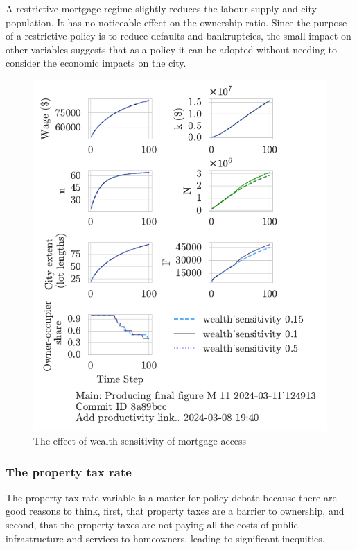 A restrictive mortgage regime slightly reduces the labour supply and city population. It has no noticeable effect on the ownership ratio. Since the purpose of a restrictive policy is to reduce defaults and bankruptcies, the small impact on other variables suggests that as a policy it can be adopted without needing to consider the economic impacts on the city. 

\begin{figure}[h!bt]
    \centering
    \includegraphics[scale=.8, trim={0 1.4cm 0 0},clip]{fig/wealth_sensitivity-124913.pdf}
    \caption{The effect of wealth sensitivity of mortgage access}
    \label{fig:wealth_sensitivity_ownership_trajectory}
\end{figure}

\newpage

\subsubsection{The property tax rate}

The property tax rate variable is a matter for policy debate because there are good reasons to think, first, that property taxes are a barrier to ownership, and second, that the property taxes are not paying all the costs of public infrastructure and services to homeowners, leading to significant inequities.

